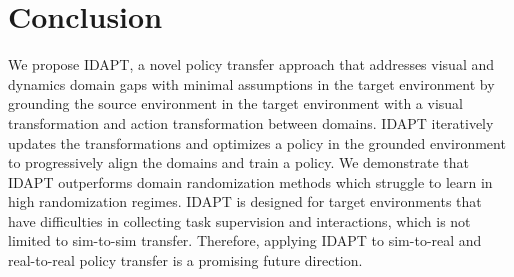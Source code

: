 \section{Conclusion}

We propose IDAPT, a novel policy transfer approach that addresses visual and dynamics domain gaps with minimal assumptions in the target environment by grounding the source environment in the target environment with a visual transformation and action transformation between domains.  IDAPT iteratively updates the transformations and optimizes a policy in the grounded environment to progressively align the domains and train a policy.  We demonstrate that IDAPT outperforms domain randomization methods which struggle to learn in high randomization regimes.
IDAPT is designed for target environments that have difficulties in collecting task supervision and interactions, which is not limited to sim-to-sim transfer. Therefore, applying IDAPT to sim-to-real and real-to-real policy transfer is a promising future direction.